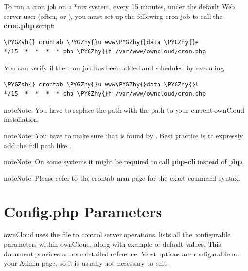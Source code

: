 \documentclass[letterpaper,10pt,english]{sphinxmanual}
\def\PYGZsh{\char`\#}
\def\PYGZhy{\char`\-}
\begin{document}
To run a cron job on a *nix system, every 15 minutes, under the default Web server user (often,  or ), you must set up the following cron job to call the \textbf{cron.php} script:

\begin{Verbatim}[commandchars=\\\{\}]
\PYGZsh{} crontab \PYGZhy{}u www\PYGZhy{}data \PYGZhy{}e
*/15  *  *  *  * php \PYGZhy{}f /var/www/owncloud/cron.php
\end{Verbatim}

You can verify if the cron job has been added and scheduled by executing:

\begin{Verbatim}[commandchars=\\\{\}]
\PYGZsh{} crontab \PYGZhy{}u www\PYGZhy{}data \PYGZhy{}l
*/15  *  *  *  * php \PYGZhy{}f /var/www/owncloud/cron.php
\end{Verbatim}

\begin{notice}{note}{Note:}
You have to replace the path  with the path to your current ownCloud installation.
\end{notice}

\begin{notice}{note}{Note:}
You have to make sure that  is found by . Best practice is to expressly add the full path like .
\end{notice}

\begin{notice}{note}{Note:}
On some systems it might be required to call \textbf{php-cli} instead of \textbf{php}.
\end{notice}

\begin{notice}{note}{Note:}
Please refer to the crontab man page for the exact command syntax.
\end{notice}


\section{Config.php Parameters}
\label{configuration_server/config_sample_php_parameters:config-php-parameters}\label{configuration_server/config_sample_php_parameters::doc}\label{configuration_server/config_sample_php_parameters:easycron}
ownCloud uses the  file to control server operations.
 lists all the configurable parameters within
ownCloud, along with example or default values. This document provides a more
detailed reference. Most options are configurable on your Admin page, so it
is usually not necessary to edit .
\end{document}
